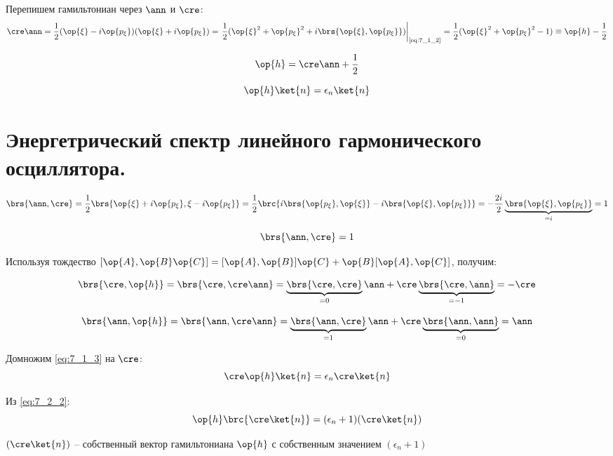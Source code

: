 Перепишем гамильтониан через $\ann$ и $\cre$:
$$
\cre\ann = \frac{1}{2} (\op{\xi} - i\op{p_\xi})(\op{\xi} + i\op{p_\xi}) = \left. \frac{1}{2}(\op{\xi}^2 + \op{p_\xi}^2 + i \brs{\op{\xi}, \op{p_\xi}}) \right|_{\text{\eqref{eq:7_1_2}}} = \frac{1}{2} (\op{\xi}^2 + \op{p_\xi}^2 - 1) \equiv \op{h} - \frac{1}{2}
$$

$$
\op{h} = \cre\ann + \frac{1}{2}
$$

\begin{equation}
\label{eq:7_1_3}
\op{h} \ket{n} = \epsilon_n \ket{n}
\end{equation}

\section{Энергетрический спектр линейного гармонического осциллятора.}

$$
\brs{\ann, \cre} = \frac{1}{2} \brs{ \op{\xi} + i\op{p_\xi},  \xi - i\op{p_\xi}} = \frac{1}{2} \brc{ i\brs{\op{p_\xi}, \op{\xi}} - i \brs{\op{\xi}, \op{p_\xi}} } = -\frac{2i}{2} \underbrace{ \brs{\op{\xi}, \op{p_\xi}}}_{= i} = 1
$$

\begin{equation}
\label{eq:7_2_1}
\brs{\ann, \cre} = 1
\end{equation}

Используя тождество $[\op{A}, \op{B}\op{C}] = [\op{A}, \op{B}] \op{C} + \op{B} [\op{A}, \op{C}]$, получим:

\begin{equation}
\label{eq:7_2_2}
\brs{\cre, \op{h}} = \brs{\cre, \cre\ann} = \underbrace{\brs{\cre, \cre}}_{= 0} \ann + \cre \underbrace{\brs{\cre, \ann}}_{= -1} = - \cre
\end{equation}

\begin{equation}
\label{eq:7_2_3}
\brs{\ann, \op{h}} = \brs{\ann, \cre\ann} = \underbrace{\brs{\ann, \cre}}_{= 1} \ann + \cre \underbrace{\brs{\ann, \ann}}_{= 0} = \ann
\end{equation}

Домножим \eqref{eq:7_1_3} на $\cre$:
$$
\cre \op{h} \ket{n} = \epsilon_n \cre \ket{n}
$$

Из \eqref{eq:7_2_2}:
\begin{equation}
\label{eq:7_2_4}
\op{h} \brc{\cre \ket{n}} = (\epsilon_n + 1)(\cre \ket{n})
\end{equation}

$(\cre \ket{n})$ -- собственный вектор гамильтониана $\op{h}$ с собственным значением $(\epsilon_n + 1)$

